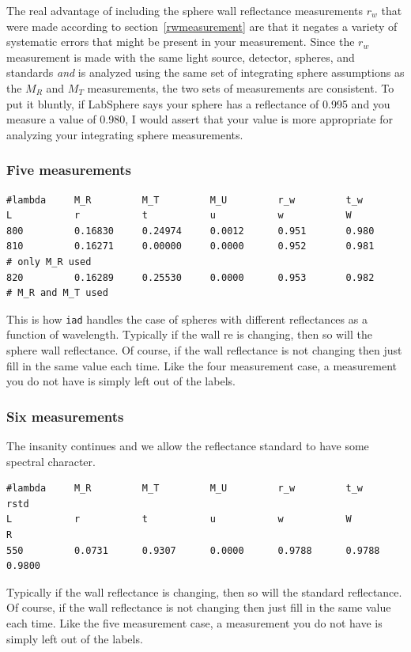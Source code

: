 \documentclass{article}
\newcommand\iadprog{\texttt{iad}}
\begin{document}
The real advantage of including the sphere wall reflectance measurements $r_w$
that were made according to section~\ref{rwmeasurement} are that it negates a
variety of systematic errors that might be present in your measurement.  Since
the $r_w$ measurement is made with the same light source, detector, spheres, and
standards \textit{and} is analyzed using the same set of integrating sphere 
assumptions as the $M_R$ and $M_T$ measurements, the two sets of measurements
are consistent.  To put it bluntly, if LabSphere says your sphere has a reflectance
of 0.995 and you measure a value of 0.980, I would assert that your value is
more appropriate for analyzing your integrating sphere measurements.  

\subsubsection{Five measurements}

\begin{center}
\begin{minipage}{12cm}
\scriptsize
\begin{verbatim}
#lambda     M_R         M_T         M_U         r_w         t_w
L           r           t           u           w           W
800         0.16830     0.24974     0.0012      0.951       0.980
810         0.16271     0.00000     0.0000      0.952       0.981       # only M_R used
820         0.16289     0.25530     0.0000      0.953       0.982       # M_R and M_T used
\end{verbatim}
\end{minipage}
\end{center}
This is how \iadprog{} handles the case of spheres with
different reflectances as a function of wavelength.  Typically if the
wall re is changing, then so will the sphere wall reflectance.  Of course,
if the wall reflectance is not changing then just fill in the same value
each time.  Like the four measurement case, a measurement you do not have
is simply left out of the labels.

\subsubsection{Six measurements}
The insanity continues and we allow the reflectance
standard to have some spectral character.
\begin{center}
\begin{minipage}{11cm}
\scriptsize
\begin{verbatim}
#lambda     M_R         M_T         M_U         r_w         t_w         rstd
L           r           t           u           w           W           R
550         0.0731      0.9307      0.0000      0.9788      0.9788      0.9800
\end{verbatim}
\end{minipage}
\end{center}
Typically if the wall reflectance is changing, then so will the 
standard reflectance.  Of course,
if the wall reflectance is not changing then just fill in the same value
each time.  Like the five measurement case, a measurement you do not have
is simply left out of the labels.
\end{document}
